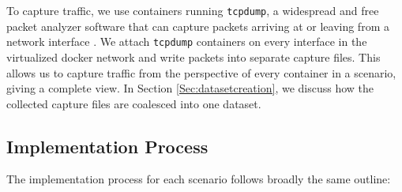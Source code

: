 \documentclass[sigconf]{acmart}
\begin{document}
To capture traffic, we use containers running \texttt{tcpdump}, a widespread and free packet analyzer software that can capture packets arriving at or leaving from a network interface \cite{jacobson1989tcpdump}.
We attach \texttt{tcpdump} containers on every interface in the virtualized docker network and write packets into separate capture files. This allows us to capture traffic from the perspective of every container in a scenario, giving a complete view. %
In Section \ref{Sec:datasetcreation}, we discuss how the collected capture files are coalesced into one dataset.


\subsection{Implementation Process}

The implementation process for each scenario follows broadly the same outline: 
\end{document}
